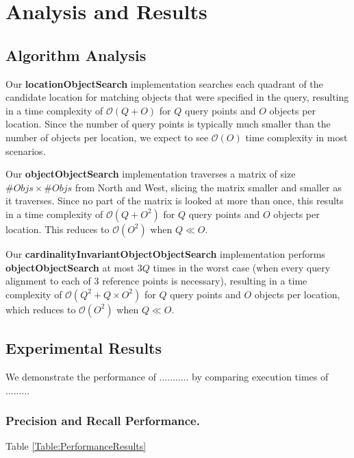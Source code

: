 \section{Analysis and Results}
\label{section:results}


\subsection{Algorithm Analysis}

Our \textbf{locationObjectSearch} implementation searches each quadrant of the candidate location for matching objects that were specified in the query, resulting in a time complexity of $\mathcal{O}(Q + O)$ for $Q$ query points and $O$ objects per location. 
Since the number of query points is typically much smaller than the number of objects per location, we expect to see $\mathcal{O}(O)$ time complexity in most scenarios.

Our \textbf{objectObjectSearch} implementation traverses a matrix of size $\# Objs \times \# Objs$ from North and West, slicing the matrix smaller and smaller as it traverses. 
Since no part of the matrix is looked at more than once, this results in a time complexity of $\mathcal{O}(Q + O^2)$ for $Q$ query points and $O$ objects per location. 
This reduces to $\mathcal{O}(O^2)$ when $Q \ll O$. %

Our \textbf{cardinalityInvariantObjectObjectSearch} implementation performs \textbf{objectObjectSearch} at most $3Q$ times in the worst case (when every query alignment to each of 3 reference points is necessary), resulting in a time complexity of $\mathcal{O}(Q^2 + Q\times O^2)$ for $Q$ query points and $O$ objects per location, which reduces to $\mathcal{O}(O^2)$ when $Q \ll O$. 


\subsection{Experimental Results}
We demonstrate the performance of ........... by comparing execution times of ......... 

\subsubsection{Precision and Recall Performance.} Table \ref{Table:PerformanceResults}

